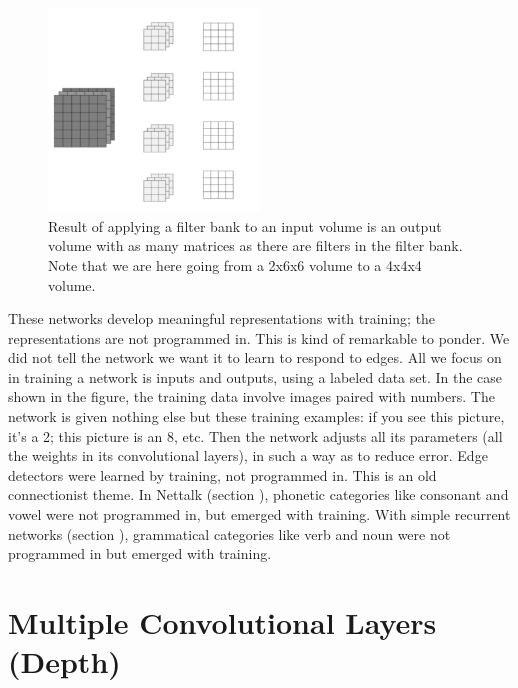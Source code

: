 \begin{figure}
\centering
\includegraphics[width=0.5\textwidth]{images/multipleFilters}
\caption[Jeff Yoshimi.]{Result of applying a filter bank to an input volume is an output volume with as many matrices as there are filters in the filter bank. Note that we are here going from a 2x6x6 volume to a 4x4x4 volume.}
\label{combing2}
\end{figure}

These networks develop meaningful representations with training; the representations are not programmed in. This is kind of remarkable to ponder. We did not tell the network we want it to learn to respond to edges. All we focus on in training a network is inputs and outputs, using a labeled data set.  In the case shown in the figure, the training data involve images paired with numbers. The network is given nothing else but these training examples: if you see this picture, it's a 2; this picture is an 8, etc. Then the network adjusts all its parameters (all the weights in its convolutional layers), in such a way as to reduce error.  Edge detectors were learned by training, not programmed in. This is an old connectionist theme. In Nettalk (section ), phonetic categories like consonant and vowel were not programmed in, but emerged with training. With simple recurrent networks  (section ), grammatical categories like verb and noun were not programmed in but  emerged with training.

\section{Multiple Convolutional Layers (Depth)}


